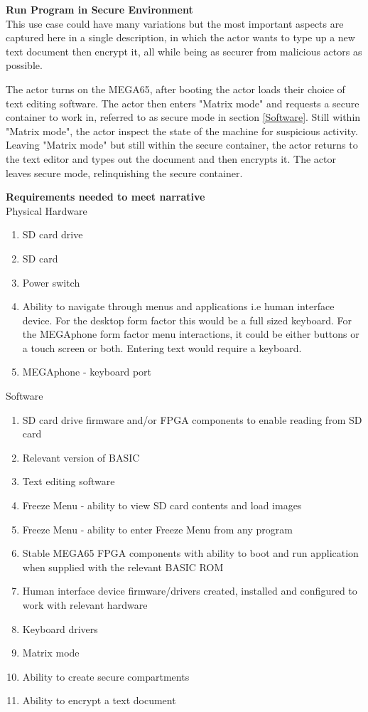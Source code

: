 \textbf{Run Program in Secure Environment}\\
This use case could have many variations but the most important aspects are captured here in a single description, in which the actor wants to type up a new text document then encrypt it, all while being as securer from malicious actors as possible.

The actor turns on the MEGA65, after booting the actor loads their choice of text editing software. The actor then enters "Matrix mode" and requests a secure container to work in, referred to as secure mode in section \ref{Software}. Still within "Matrix mode", the actor inspect the state of the machine for suspicious activity. Leaving "Matrix mode" but still within the secure container, the actor returns to the text editor and types out the document and then encrypts it. The actor leaves secure mode, relinquishing the secure container.

\textbf{Requirements needed to meet narrative}\\
Physical Hardware
\begin{enumerate}
\item SD card drive
\item SD card
\item Power switch
\item Ability to navigate through menus and applications i.e human interface device. For the desktop form factor this would be a full sized keyboard. For the MEGAphone form factor menu interactions, it could be either buttons or a touch screen or both. Entering text would require a keyboard.
\item MEGAphone - keyboard port
\end{enumerate}

Software\\
\begin{enumerate}
\item SD card drive firmware and/or FPGA components to enable reading from SD card
\item Relevant version of BASIC 
\item Text editing software
\item Freeze Menu - ability to view SD card contents and load images
\item Freeze Menu - ability to enter Freeze Menu from any program
\item Stable MEGA65 FPGA components with ability to boot and run application when supplied with the relevant BASIC ROM
\item Human interface device firmware/drivers created, installed and configured to work with relevant hardware
\item Keyboard drivers
\item Matrix mode
\item Ability to create secure compartments
\item Ability to encrypt a text document
\end{enumerate}

